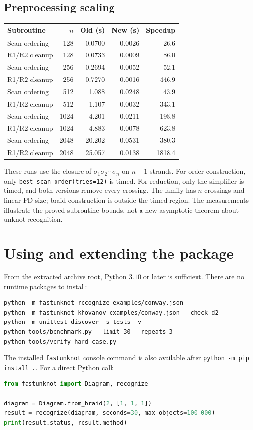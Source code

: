 \documentclass[11pt]{article}
\theoremstyle{remark}\newtheorem{remark}[theorem]{Remark}
\newcommand{\code}[1]{\texttt{\small #1}}
\begin{document}
\subsection{Preprocessing scaling}

\begin{center}\small
\begin{tabular}{@{}lrrrr@{}}
\toprule
Subroutine & $n$ & Old (s) & New (s) & Speedup\\
\midrule
Scan ordering & 128 & 0.0700 & 0.0026 & 26.6\\
R1/R2 cleanup & 128 & 0.0733 & 0.0009 & 86.0\\
Scan ordering & 256 & 0.2694 & 0.0052 & 52.1\\
R1/R2 cleanup & 256 & 0.7270 & 0.0016 & 446.9\\
Scan ordering & 512 & 1.088 & 0.0248 & 43.9\\
R1/R2 cleanup & 512 & 1.107 & 0.0032 & 343.1\\
Scan ordering & 1024 & 4.201 & 0.0211 & 198.8\\
R1/R2 cleanup & 1024 & 4.883 & 0.0078 & 623.8\\
Scan ordering & 2048 & 20.202 & 0.0531 & 380.3\\
R1/R2 cleanup & 2048 & 25.057 & 0.0138 & 1818.4\\
\bottomrule\end{tabular}\end{center}

These runs use the closure of
$\sigma_1\sigma_2\cdots\sigma_n$ on $n+1$ strands. For order construction,
only \code{best\_scan\_order(tries=12)} is timed. For reduction, only the
simplifier is timed, and both versions remove every crossing. The family
has $n$ crossings and linear PD size; braid construction is outside the
timed region. The measurements illustrate the proved subroutine bounds,
not a new asymptotic theorem about unknot recognition.

\clearpage
\section{Using and extending the package}

From the extracted archive root, Python $3.10$ or later is sufficient.
There are no runtime packages to install:
\begin{lstlisting}
python -m fastunknot recognize examples/conway.json
python -m fastunknot khovanov examples/conway.json --check-d2
python -m unittest discover -s tests -v
python tools/benchmark.py --limit 30 --repeats 3
python tools/verify_hard_case.py
\end{lstlisting}
The installed \code{fastunknot} console command is also available after
\code{python -m pip install .}. For a direct Python call:
\begin{lstlisting}[language=Python]
from fastunknot import Diagram, recognize

diagram = Diagram.from_braid(2, [1, 1, 1])
result = recognize(diagram, seconds=30, max_objects=100_000)
print(result.status, result.method)
\end{lstlisting}
\end{document}
